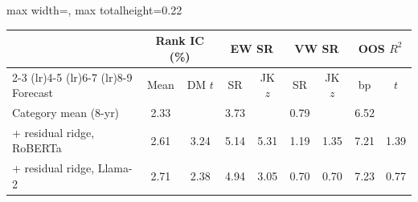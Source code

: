 \begin{table}[htbp]
{\begin{adjustbox}{max width=\linewidth, max totalheight=0.22\textheight}
\begin{tabular}{lcccccccc}
 & \multicolumn{2}{c}{Rank IC (\%)} & \multicolumn{2}{c}{EW SR} & \multicolumn{2}{c}{VW SR} & \multicolumn{2}{c}{OOS $R^2$} \\
\cmidrule(lr){2-3} \cmidrule(lr){4-5} \cmidrule(lr){6-7} \cmidrule(lr){8-9}
Forecast & Mean & DM $t$ & SR & JK $z$ & SR & JK $z$ & bp & $t$ \\
\midrule
Category mean (8-yr) & 2.33 &  & 3.73 &  & 0.79 &  & 6.52 &  \\
+ residual ridge, RoBERTa & 2.61 & 3.24 & 5.14 & 5.31 & 1.19 & 1.35 & 7.21 & 1.39 \\
+ residual ridge, Llama-2 & 2.71 & 2.38 & 4.94 & 3.05 & 0.70 & 0.70 & 7.23 & 0.77 \\
\bottomrule
\end{tabular}
\end{adjustbox}
}
\end{table}
